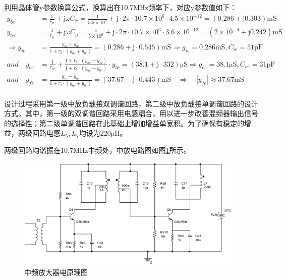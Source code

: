 \documentclass[a4paper,12pt,twoside]{article}
\begin{document}
利用晶体管y参数换算公式，换算出在10.7MHz频率下，对应y参数值如下：
\begin{equation}
\begin{aligned}
    y_{be}&=\frac{1}{r_{\pi}}+\mathrm{j}\omega C_{\pi}=\frac{1}{3.5\times 10^3}+\mathrm{j}\cdot 2\pi \cdot 10.7 \times 10^{6}\cdot 4.5\times 10^{-12}= (0.286+\mathrm{j}0.303) \mathrm{mS}\\
    y_{bc}&=\frac{1}{r_{\mu}}+\mathrm{j}\omega C_{\mu}=\frac{1}{5\times 10^{6}}+\mathrm{j}\cdot 2\pi \cdot 10.7 \times 10^{6}\cdot  3.6\times 10^{-12}=(2\times 10^{-4}+\mathrm{j}0.242) \mathrm{mS}\\
    \Rightarrow 
  y_{ie}&=\frac{y_{be}+y_{bc}}{1+r_b\cdot(y_{be}+y_{bc})}= (0.286+\mathrm{j}\cdot 0.545)\mathrm{mS} \Rightarrow g_{ie}=0.286\mathrm{mS},C_{ie}=51\mathrm{pF}\\
  and\quad y_{oe}&=\frac{1}{r_{ce}}+\frac{1+r_b\cdot (y_{be}+g_m)}{1+r_b\cdot(y_{be}+y_{bc})}\cdot y_{bc}=(38.1+\mathrm{j}\cdot 332)\mathrm{\mu S}\Rightarrow g_{oe}=38.1\mathrm{\mu S},C_{oe}=31\mathrm{pF}\\
  and\quad  y_{fe}&=\frac{g_m-y_{bc}}{1+r_{b}\cdot (y_{be}+y_{bc})}=(37.67-\mathrm{j}\cdot 0.443)\mathrm{mS} \quad\Rightarrow \quad|y_{fe}|\approx 37.67\mathrm{mS}\\
\end{aligned}
\end{equation}

设计过程采用第一级中放负载接双调谐回路，第二级中放负载接单调谐回路的设计方式。其中，第一级的双调谐回路采用电感耦合，用以进一步改善混频器输出信号的选择性；第二级单调谐回路在此基础上增加增益单宽积。为了确保有稳定的增益，两级回路电感$L_5,L_7$均设为220$\mathrm{\mu}$H。

两级回路均谐振在10.7MHz中频处，中放电路图如图\ref{中放电原理}所示。
\begin{figure}[H]
    \centering
    \includegraphics[scale=0.11]{中放电路原理图.png}
    \caption{中频放大器电原理图}
    \label{中放电原理}
\end{figure}
\end{document}
